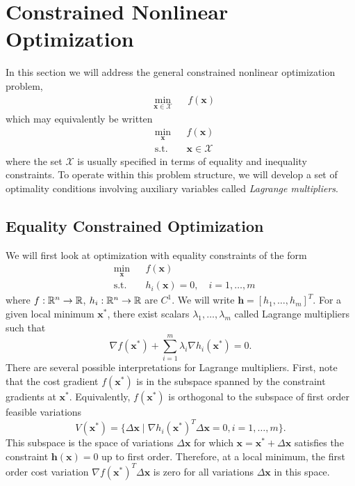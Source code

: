 \section{Constrained Nonlinear Optimization}

In this section we will address the general constrained nonlinear optimization problem,
\begin{equation*}
\begin{aligned}
& \underset{\bm{x} \in \mathcal{X}}{\min}
& & f(\bm{x})
\end{aligned}
\end{equation*}
which may equivalently be written
\begin{equation*}
\begin{aligned}
& \underset{\bm{x}}{\min}
& & f(\bm{x})\\
& \textrm{s.t.} & & \bm{x} \in \mathcal{X}
\end{aligned}
\end{equation*}
where the set $\mathcal{X}$ is usually specified in terms of equality and inequality constraints. To operate within this problem structure, we will develop a set of optimality conditions involving auxiliary variables called \textit{Lagrange multipliers}. 

\subsection{Equality Constrained Optimization}

We will first look at optimization with equality constraints of the form 
\begin{equation*}
\begin{aligned}
& \underset{\bm{x}}{\min}
& & f(\bm{x})\\
& \textrm{s.t.} & & h_i(\bm{x}) = 0, \quad i = 1, \ldots, m
\end{aligned}
\end{equation*}
where $f:\mathbb{R}^n \to \mathbb{R}$, $h_i:\mathbb{R}^n \to \mathbb{R}$ are $C^1$. We will write $\bm{h} = [h_1,\ldots, h_m ]^T$. For a given local minimum $\bm{x}^*$, there exist scalars $\lambda_1, \ldots, \lambda_m$ called Lagrange multipliers such that 
\begin{equation}
    \nabla f(\bm{x}^*) + \sum^m_{i=1} \lambda_i \nabla h_i(\bm{x}^*) = 0.
\end{equation}
There are several possible interpretations for Lagrange multipliers. First, note that the cost gradient $f(\bm{x}^*)$ is in the subspace spanned by the constraint gradients at $\bm{x}^*$. Equivalently, $f(\bm{x}^*)$ is orthogonal to the subspace of first order feasible variations 
\begin{equation}
    V(\bm{x}^*) = \{\Delta \bm{x} \mid \nabla h_i(\bm{x}^*)^T \Delta \bm{x} = 0, i=1,\ldots,m\}.
\end{equation}
This subspace is the space of variations $\Delta \bm{x}$ for which $\bm{x} = \bm{x}^* + \Delta \bm{x}$ satisfies the constraint $\bm{h}(\bm{x}) = 0$ up to first order. Therefore, at a local minimum, the first order cost variation $\nabla f(\bm{x}^*)^T \Delta \bm{x}$ is zero for all variations $\Delta \bm{x}$ in this space. 

